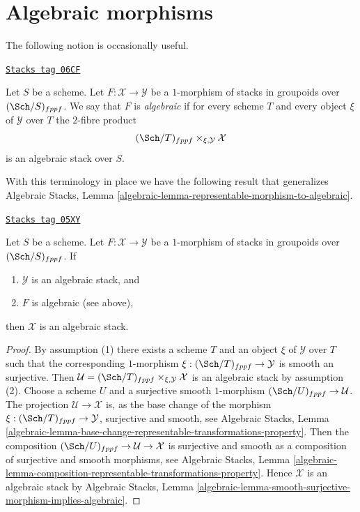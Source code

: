 \section{Algebraic morphisms}
\label{criteria-section-algebraic}
The following notion is occasionally useful.

\begin{definition}[Algebraic]
\label{criteria-definition-algebraic}
\href{https://stacks.math.columbia.edu/tag/06CF}{\texttt{Stacks tag 06CF}}

Let $S$ be a scheme. Let $F : \mathcal{X} \to \mathcal{Y}$ be a
$1$-morphism of stacks in groupoids over $(\Sch/S)_{fppf}$.
We say that $F$ is {\it algebraic} if for every scheme $T$ and every
object $\xi$ of $\mathcal{Y}$ over $T$ the $2$-fibre product
$$
(\Sch/T)_{fppf} \times_{\xi, \mathcal{Y}} \mathcal{X}
$$
is an algebraic stack over $S$.
\end{definition}

With this terminology in place we have the following result that generalizes
Algebraic Stacks, Lemma
\ref{algebraic-lemma-representable-morphism-to-algebraic}.

\begin{lemma}
\label{criteria-lemma-algebraic-morphism-to-algebraic}
\href{https://stacks.math.columbia.edu/tag/05XY}{\texttt{Stacks tag 05XY}}

Let $S$ be a scheme.
Let $F : \mathcal{X} \to \mathcal{Y}$ be a $1$-morphism of
stacks in groupoids over $(\Sch/S)_{fppf}$. If
\begin{enumerate}
\item $\mathcal{Y}$ is an algebraic stack, and
\item $F$ is algebraic (see above),
\end{enumerate}
then $\mathcal{X}$ is an algebraic stack.
\end{lemma}

\begin{proof}
By assumption (1) there exists a scheme $T$ and an object
$\xi$ of $\mathcal{Y}$ over $T$ such that the corresponding
$1$-morphism $\xi : (\Sch/T)_{fppf} \to \mathcal{Y}$
is smooth an surjective. Then
$\mathcal{U} = (\Sch/T)_{fppf} \times_{\xi, \mathcal{Y}} \mathcal{X}$
is an algebraic stack by assumption (2).
Choose a scheme $U$ and a surjective smooth $1$-morphism
$(\Sch/U)_{fppf} \to \mathcal{U}$.
The projection $\mathcal{U} \longrightarrow \mathcal{X}$
is, as the base change of the morphism
$\xi : (\Sch/T)_{fppf} \to \mathcal{Y}$,
surjective and smooth, see
Algebraic Stacks, Lemma
\ref{algebraic-lemma-base-change-representable-transformations-property}.
Then the composition
$(\Sch/U)_{fppf} \to \mathcal{U} \to \mathcal{X}$
is surjective and smooth as a composition of surjective and smooth
morphisms, see
Algebraic Stacks, Lemma
\ref{algebraic-lemma-composition-representable-transformations-property}.
Hence $\mathcal{X}$ is an algebraic stack by
Algebraic Stacks, Lemma
\ref{algebraic-lemma-smooth-surjective-morphism-implies-algebraic}.
\end{proof}

